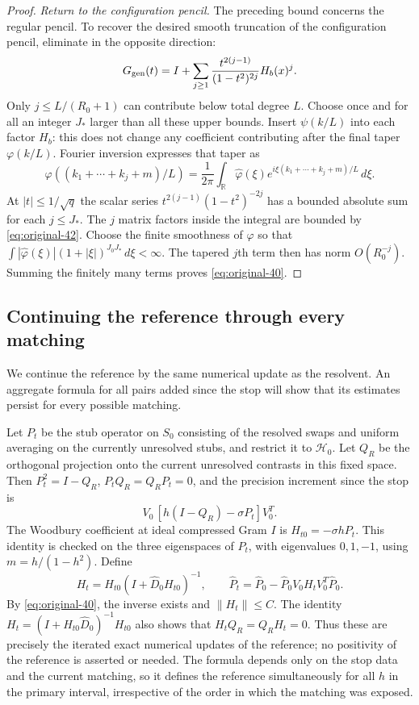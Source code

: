 \begin{proof}
\par\smallskip\noindent
\textit{Return to the configuration pencil.}
The preceding bound concerns the regular pencil.  To recover the desired
smooth truncation of the configuration pencil, eliminate in the opposite
direction:
\[
 G_{\rm gen}(t)
 =I+\sum_{j\ge1}\frac{t^{2(j-1)}}{(1-t^2)^{2j}}H_b(x)^j.
\]
Only $j\le L/(R_0+1)$ can contribute below total degree $L$.
Choose once and for all an integer $J_*$ larger than all these upper
bounds.  Insert $\psi(k/L)$ into each factor $H_b$: this does not
change any coefficient contributing after the final taper
$\varphi(k/L)$.  Fourier inversion expresses that taper as
\[
 \varphi((k_1+\cdots+k_j+m)/L)
 =\frac1{2\pi}\int_{\mathbb R}\widehat\varphi(\xi)
             e^{i\xi(k_1+\cdots+k_j+m)/L}\,d\xi.
\]
At $|t|\le1/\sqrt q$ the scalar series
$t^{2(j-1)}(1-t^2)^{-2j}$ has a bounded absolute sum for each
$j\le J_*$.  The $j$ matrix factors inside the integral are bounded
by \eqref{eq:original-42}.  Choose the finite smoothness of
$\varphi$ so that
$\int |\widehat\varphi(\xi)|(1+|\xi|)^{J_0J_*}\,d\xi<\infty$.
The tapered $j$th term then has norm $O(R_0^{-j})$.
Summing the finitely many terms proves
\eqref{eq:original-40}.
\end{proof}

\subsection{Continuing the reference through every matching}

We continue the reference by the same numerical update as the resolvent.
An aggregate formula for all pairs added since the stop will show that
its estimates persist for every possible matching.

Let $P_t$ be the stub operator on $S_0$ consisting of the resolved
swaps and uniform averaging on the currently unresolved stubs, and
restrict it to $\mathcal H_0$.  Let $Q_R$ be the orthogonal projection
onto the current unresolved contrasts in this fixed space.  Then
$P_t^2=I-Q_R$, $P_tQ_R=Q_RP_t=0$, and the precision increment since
the stop is
\[
 V_0\,[h(I-Q_R)-\sigma P_t]V_0^T.
\]
The Woodbury coefficient at ideal compressed Gram $I$ is
$H_{t0}=-\sigma hP_t$.  This identity is checked on the three
eigenspaces of $P_t$, with eigenvalues $0,1,-1$, using
$m=h/(1-h^2)$.  Define
\[
 H_t=H_{t0}(I+\widehat D_0H_{t0})^{-1},\qquad
 \widehat P_t=\widehat P_0
       -\widehat P_0V_0H_tV_0^T\widehat P_0.
\]
By \eqref{eq:original-40}, the inverse exists and $\|H_t\|\le C$.
The identity
$H_t=(I+H_{t0}\widehat D_0)^{-1}H_{t0}$ also shows that
$H_tQ_R=Q_RH_t=0$.  Thus these are precisely the iterated exact
numerical updates of the reference; no positivity of the reference
is asserted or needed.  The formula depends only on the stop data and
the current matching, so it defines the reference simultaneously for
all $h$ in the primary interval, irrespective of the order in which
the matching was exposed.

